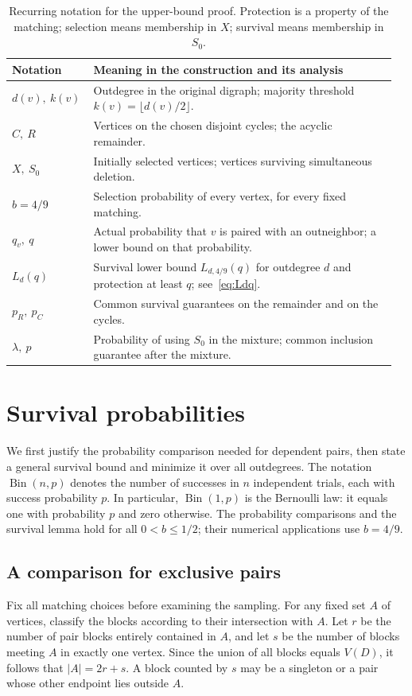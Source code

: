 \documentclass[10pt,a4paper]{article}
\DeclareMathOperator{\Bin}{Bin}
\newcommand{\floor}[1]{\lfloor #1\rfloor}
\newcommand{\abs}[1]{|#1|}
\begin{document}
\begin{table}[!ht]
\centering
\small
\renewcommand{\arraystretch}{1.16}
\begin{tabular}{@{}p{0.19\linewidth}p{0.77\linewidth}@{}}
\toprule
Notation & Meaning in the construction and its analysis \\
\midrule
\(d(v),\ k(v)\) & Outdegree in the original digraph; majority threshold \(k(v)=\floor{d(v)/2}\). \\
\(C,\ R\) & Vertices on the chosen disjoint cycles; the acyclic remainder. \\
\(X,\ S_0\) & Initially selected vertices; vertices surviving simultaneous deletion. \\
\(b=4/9\) & Selection probability of every vertex, for every fixed matching. \\
\(q_v,\ q\) & Actual probability that \(v\) is paired with an outneighbor; a lower bound on that probability. \\
\(L_d(q)\) & Survival lower bound \(L_{d,4/9}(q)\) for outdegree \(d\) and protection at least \(q\); see~\eqref{eq:Ldq}. \\
\(p_R,\ p_C\) & Common survival guarantees on the remainder and on the cycles. \\
\(\lambda,\ p\) & Probability of using \(S_0\) in the mixture; common inclusion guarantee after the mixture. \\
\bottomrule
\end{tabular}
\caption{Recurring notation for the upper-bound proof. Protection is a property of the matching; selection means membership in \(X\); survival means membership in \(S_0\).}
\label{tab:notation}
\end{table}
\FloatBarrier

\section{Survival probabilities}
\label{sec:analysis}

We first justify the probability comparison needed for dependent pairs, then state a general survival bound and minimize it over all outdegrees. The notation \(\Bin(n,p)\) denotes the number of successes in \(n\) independent trials, each with success probability \(p\). In particular, \(\Bin(1,p)\) is the Bernoulli law: it equals one with probability \(p\) and zero otherwise. The probability comparisons and the survival lemma hold for all \(0<b\le1/2\); their numerical applications use \(b=4/9\).

\subsection{A comparison for exclusive pairs}\label{sec:paircomparison}
Fix all matching choices before examining the sampling. For any fixed set \(A\) of vertices, classify the blocks according to their intersection with \(A\). Let \(r\) be the number of pair blocks entirely contained in \(A\), and let \(s\) be the number of blocks meeting \(A\) in exactly one vertex. Since the union of all blocks  equals $V(D)$,  it follows that \(\abs A=2r+s\). A block counted by \(s\) may be a singleton or a pair whose other endpoint lies outside \(A\).
\end{document}
